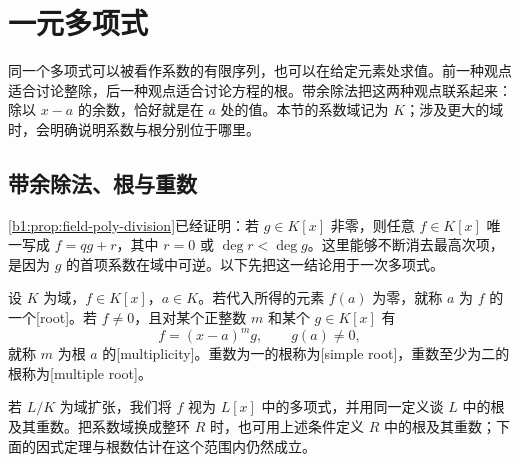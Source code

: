 
\section{一元多项式}
\label{b1:sec:1201}

%
%

同一个多项式可以被看作系数的有限序列，也可以在给定元素处求值。前一种观点适合讨论整除，后一种观点适合讨论方程的根。带余除法把这两种观点联系起来：除以 \(x-a\) 的余数，恰好就是在 \(a\) 处的值。本节的系数域记为 \(K\)；涉及更大的域时，会明确说明系数与根分别位于哪里。

\subsection{带余除法、根与重数}
\label{b1:subsec:1201:01}

\cref{b1:prop:field-poly-division}已经证明：若 \(g\in K[x]\) 非零，则任意 \(f\in K[x]\) 唯一写成 \(f=qg+r\)，其中 \(r=0\) 或 \(\deg r<\deg g\)。这里能够不断消去最高次项，是因为 \(g\) 的首项系数在域中可逆。以下先把这一结论用于一次多项式。

\begin{definition}\label{b1:def:polynomial-root}
	设 \(K\) 为域，\(f\in K[x]\)，\(a\in K\)。若代入所得的元素 \(f(a)\) 为零，就称 \(a\) 为 \(f\) 的一个[root]。若 \(f\ne0\)，且对某个正整数 \(m\) 和某个 \(g\in K[x]\) 有
	\[
		f=(x-a)^m g,\qquad g(a)\ne0,
	\]
	就称 \(m\) 为根 \(a\) 的[multiplicity]。重数为一的根称为[simple root]，重数至少为二的根称为[multiple root]。
\end{definition}

若 \(L/K\) 为域扩张，我们将 \(f\) 视为 \(L[x]\) 中的多项式，并用同一定义谈 \(L\) 中的根及其重数。把系数域换成整环 \(R\) 时，也可用上述条件定义 \(R\) 中的根及其重数；下面的因式定理与根数估计在这个范围内仍然成立。


